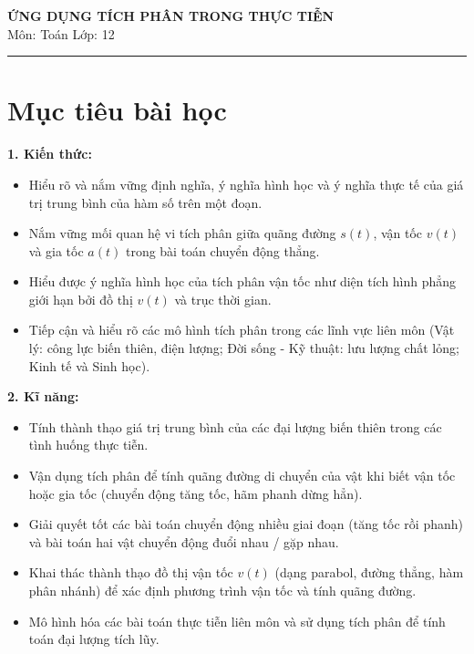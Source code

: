 \documentclass[12pt]{article}
\begin{document}
	
	\begin{center}
		{\LARGE \textbf{ỨNG DỤNG TÍCH PHÂN TRONG THỰC TIỄN}}\\[4pt]
		{\large Môn: Toán \quad Lớp: 12}
	\end{center}
	\vspace{4mm}
	\hrule
	\vspace{4mm}
	
	\section*{Mục tiêu bài học}
	
	\textbf{1. Kiến thức:} 
	\begin{itemize}
		\item Hiểu rõ và nắm vững định nghĩa, ý nghĩa hình học và ý nghĩa thực tế của giá trị trung bình của hàm số trên một đoạn.
		\item Nắm vững mối quan hệ vi tích phân giữa quãng đường $s(t)$, vận tốc $v(t)$ và gia tốc $a(t)$ trong bài toán chuyển động thẳng.
		\item Hiểu được ý nghĩa hình học của tích phân vận tốc như diện tích hình phẳng giới hạn bởi đồ thị $v(t)$ và trục thời gian.
		\item Tiếp cận và hiểu rõ các mô hình tích phân trong các lĩnh vực liên môn (Vật lý: công lực biến thiên, điện lượng; Đời sống - Kỹ thuật: lưu lượng chất lỏng; Kinh tế và Sinh học).
	\end{itemize}
	
	\noindent \textbf{2. Kĩ năng:} 
	\begin{itemize}
		\item Tính thành thạo giá trị trung bình của các đại lượng biến thiên trong các tình huống thực tiễn.
		\item Vận dụng tích phân để tính quãng đường di chuyển của vật khi biết vận tốc hoặc gia tốc (chuyển động tăng tốc, hãm phanh dừng hẳn).
		\item Giải quyết tốt các bài toán chuyển động nhiều giai đoạn (tăng tốc rồi phanh) và bài toán hai vật chuyển động đuổi nhau / gặp nhau.
		\item Khai thác thành thạo đồ thị vận tốc $v(t)$ (dạng parabol, đường thẳng, hàm phân nhánh) để xác định phương trình vận tốc và tính quãng đường.
		\item Mô hình hóa các bài toán thực tiễn liên môn và sử dụng tích phân để tính toán đại lượng tích lũy.
	\end{itemize}
	
\end{document}
